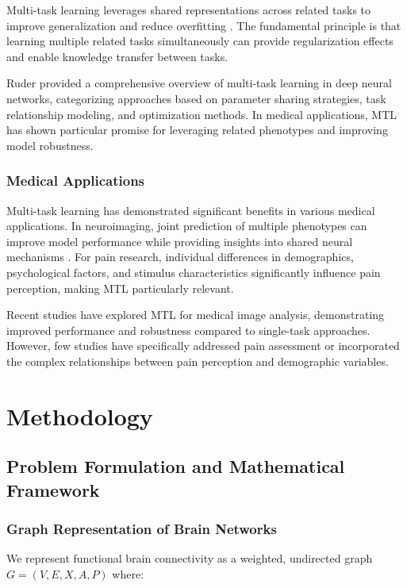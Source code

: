 \documentclass[10pt,journal,compsoc]{IEEEtran}
\begin{document}
Multi-task learning leverages shared representations across related tasks to improve generalization and reduce overfitting \cite{caruana1997multitask}. The fundamental principle is that learning multiple related tasks simultaneously can provide regularization effects and enable knowledge transfer between tasks.

Ruder \cite{ruder2017overview} provided a comprehensive overview of multi-task learning in deep neural networks, categorizing approaches based on parameter sharing strategies, task relationship modeling, and optimization methods. In medical applications, MTL has shown particular promise for leveraging related phenotypes and improving model robustness.

\subsubsection{Medical Applications}

Multi-task learning has demonstrated significant benefits in various medical applications. In neuroimaging, joint prediction of multiple phenotypes can improve model performance while providing insights into shared neural mechanisms \cite{topol2019high}. For pain research, individual differences in demographics, psychological factors, and stimulus characteristics significantly influence pain perception, making MTL particularly relevant.

Recent studies have explored MTL for medical image analysis, demonstrating improved performance and robustness compared to single-task approaches. However, few studies have specifically addressed pain assessment or incorporated the complex relationships between pain perception and demographic variables.

\section{Methodology}

\subsection{Problem Formulation and Mathematical Framework}

\subsubsection{Graph Representation of Brain Networks}

We represent functional brain connectivity as a weighted, undirected graph $G = (V, E, X, A, P)$ where:
\end{document}
